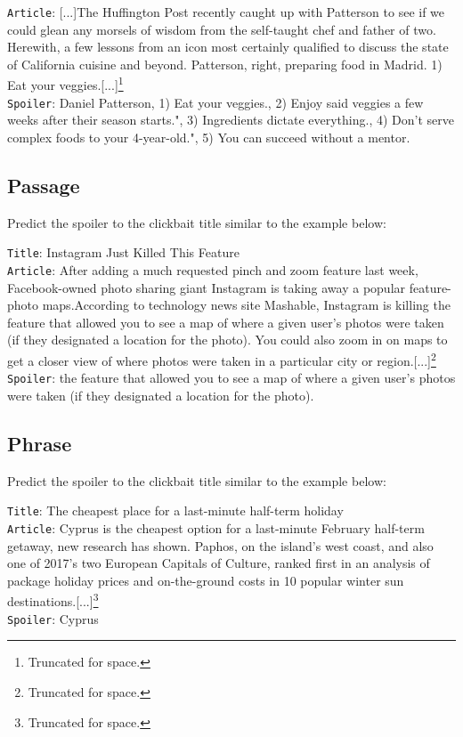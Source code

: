 \documentclass[12pt]{article}
\begin{document}
\verb|Article|: [...]The Huffington Post recently caught up with Patterson to see if we could glean any morsels of wisdom from the self-taught chef and father of two. Herewith, a few lessons from an icon most certainly qualified to discuss the state of California cuisine and beyond. Patterson, right, preparing food in Madrid. 1) Eat your veggies.[...]\footnote{Truncated for space.} 
\\

\verb|Spoiler|: Daniel Patterson, 1) Eat your veggies., 2) Enjoy said veggies a few weeks after their season starts.", 3) Ingredients dictate everything., 4) Don't serve complex foods to your 4-year-old.", 5) You can succeed without a mentor. 
\subsection{Passage}
Predict the spoiler to the clickbait title similar to the example below:

\verb|Title|: Instagram Just Killed This Feature\\

\verb|Article|: After adding a much requested pinch and zoom feature last week, Facebook-owned photo sharing giant Instagram is taking away a popular feature-photo maps.According to technology news site Mashable, Instagram is killing the feature that allowed you to see a map of where a given user's photos were taken (if they designated a location for the photo). You could also zoom in on maps to get a closer view of where photos were taken in a particular city or region.[...]\footnote{Truncated for space.}\\

\verb|Spoiler|: the feature that allowed you to see a map of where a given user's photos were taken (if they designated a location for the photo). 
\subsection{Phrase}
Predict the spoiler to the clickbait title similar to the example below:

\verb|Title|: The cheapest place for a last-minute half-term holiday\\

\verb|Article|: Cyprus is the cheapest option for a last-minute February half-term getaway, new research has shown. Paphos, on the island's west coast, and also one of 2017’s two European Capitals of Culture, ranked first in an analysis of package holiday prices and on-the-ground costs in 10 popular winter sun destinations.[...]\footnote{Truncated for space.}\\
\verb|Spoiler|: Cyprus 
\end{document}
